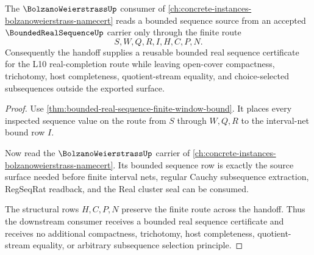 \begin{theorem}
\label{thm:bounded-real-sequence-bolzano-weierstrass-handoff}
The $\BolzanoWeierstrassUp$ consumer of \autoref{ch:concrete-instances-bolzanoweierstrass-namecert} reads a bounded sequence source from an accepted $\BoundedRealSequenceUp$ carrier only through the finite route
$$
S,W,Q,R,I,H,C,P,N.
$$
Consequently the handoff supplies a reusable bounded real sequence certificate for the L10 real-completion route while leaving open-cover compactness, trichotomy, host completeness, quotient-stream equality, and choice-selected subsequences outside the exported surface.
\end{theorem}
\begin{proof}
Use \autoref{thm:bounded-real-sequence-finite-window-bound}. It places every inspected sequence value on the route from $S$ through $W,Q,R$ to the interval-net bound row $I$.

Now read the $\BolzanoWeierstrassUp$ carrier of \autoref{ch:concrete-instances-bolzanoweierstrass-namecert}. Its bounded sequence row is exactly the source surface needed before finite interval nets, regular Cauchy subsequence extraction, RegSeqRat readback, and the Real cluster seal can be consumed.

The structural rows $H,C,P,N$ preserve the finite route across the handoff. Thus the downstream consumer receives a bounded real sequence certificate and receives no additional compactness, trichotomy, host completeness, quotient-stream equality, or arbitrary subsequence selection principle.
\end{proof}

